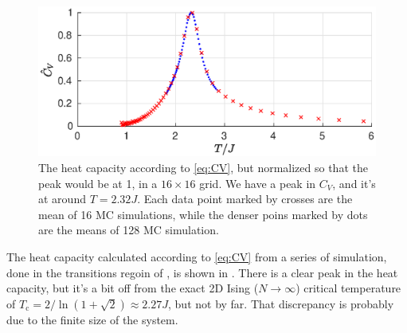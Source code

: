\documentclass[11pt,letter, swedish, english
]{article}
\newcommand{\Tc}{\ensuremath{T_{\text{c}}}}
\begin{document}
\begin{figure}
\centering
\includegraphics[width=1\textwidth]{CV_L-16_all.eps}
\caption{The heat capacity according to \eqref{eq:CV}, but normalized
  so that the peak would be at 1, in a $16\times16$ grid. We have a
  peak in $C_V$, and it's at around $T=2.32J$.  
  Each data point marked by crosses are the mean of 16 MC simulations,
  while the denser poins marked by dots are the means of 128 MC
  simulation. } 
\label{fig:CV1}
\end{figure}


The heat capacity calculated according to \eqref{eq:CV} from a
series of simulation, done in the transitions regoin of
, is shown in . There is a clear peak
in the heat capacity, but it's a bit off from the exact 2D Ising
($N\to\infty$) critical temperature of 
$\Tc = 2/\ln(1+\sqrt2) \approx 2.27J$, but not by far. That
discrepancy is probably due to the finite size of the system.
\end{document}
